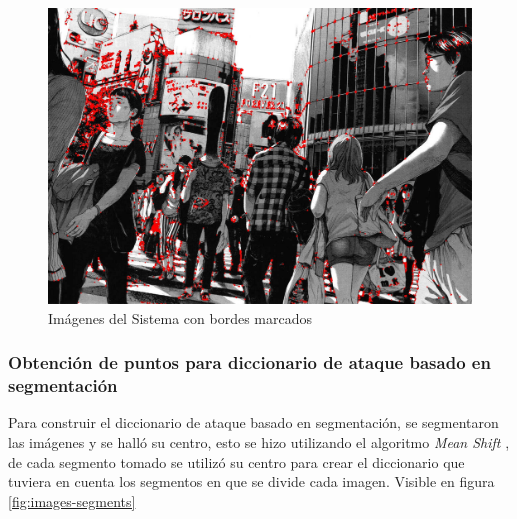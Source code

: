 \begin{figure}[ht]
\begin{minipage}[hb]{0.3\textwidth}
	\end{minipage}
	\hfill
	\begin{minipage}[hb]{0.3\textwidth}
		\centering
		\includegraphics[width=\textwidth]{Graphics/bordes_japan.jpg}
	\end{minipage}
	\caption{Imágenes del Sistema con bordes marcados}
	\label{fig:images-borders}
\end{figure}


\subsubsection{Obtenci\'on de puntos para diccionario de ataque basado en segmentaci\'on}
Para construir el diccionario de ataque basado en segmentación, se segmentaron las im\'agenes y se hall\'o su centro, esto se hizo utilizando el algoritmo \textit{Mean Shift} \cite{Comaniciu2002MeanSA}, de cada segmento tomado se utiliz\'o su centro para crear el diccionario que tuviera en cuenta los segmentos en que se divide cada imagen. Visible en figura \ref{fig:images-segments}

